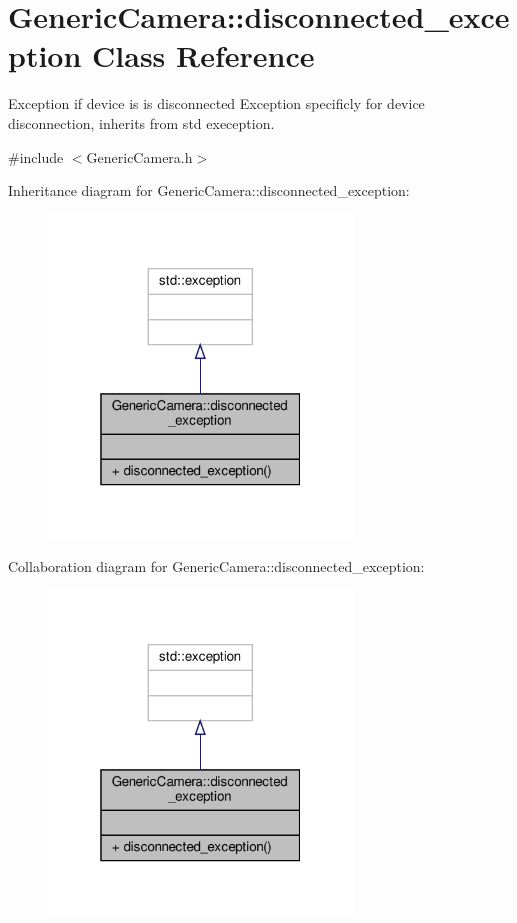\hypertarget{class_generic_camera_1_1disconnected__exception}{}\section{Generic\+Camera\+:\+:disconnected\+\_\+exception Class Reference}
\label{class_generic_camera_1_1disconnected__exception}


Exception if device is is disconnected Exception specificly for device disconnection, inherits from std exeception.  




{\ttfamily \#include $<$Generic\+Camera.\+h$>$}



Inheritance diagram for Generic\+Camera\+:\+:disconnected\+\_\+exception\+:
\nopagebreak
\begin{figure}[H]
\begin{center}
\leavevmode
\includegraphics[width=229pt]{class_generic_camera_1_1disconnected__exception__inherit__graph}
\end{center}
\end{figure}


Collaboration diagram for Generic\+Camera\+:\+:disconnected\+\_\+exception\+:
\nopagebreak
\begin{figure}[H]
\begin{center}
\leavevmode
\includegraphics[width=229pt]{class_generic_camera_1_1disconnected__exception__coll__graph}
\end{center}
\end{figure}
